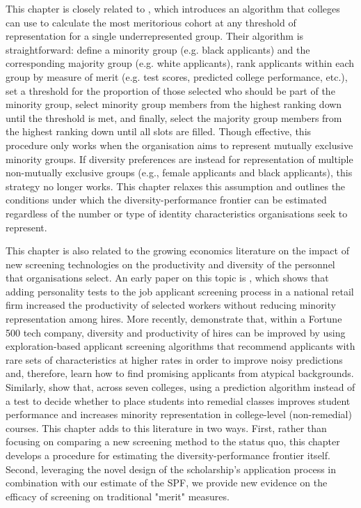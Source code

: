 This chapter is closely related to \textcite{kleinberg2018algorithmic}, which introduces an algorithm that colleges can use to calculate the most meritorious cohort at any threshold of representation for a single underrepresented group. Their algorithm is straightforward: define a minority group (e.g. black applicants) and the corresponding majority group (e.g. white applicants), rank applicants within each group by measure of merit (e.g. test scores, predicted college performance, etc.), set a threshold for the proportion of those selected who should be part of the minority group, select minority group members from the highest ranking down until the threshold is met, and finally, select the majority group members from the highest ranking down until all slots are filled. Though effective, this procedure only works when the organisation aims to represent mutually exclusive minority groups. If diversity preferences are instead for representation of multiple non-mutually exclusive groups (e.g., female applicants and black applicants), this strategy no longer works. This chapter relaxes this assumption and outlines the conditions under which the diversity-performance frontier can be estimated regardless of the number or type of identity characteristics organisations seek to represent.

This chapter is also related to the growing economics literature on the impact of new screening technologies on the productivity and diversity of the personnel that organisations select. An early paper on this topic is \textcite{autor2008does}, which shows that adding personality tests to the job applicant screening process in a national retail firm increased the productivity of selected workers without reducing minority representation among hires. More recently, \textcite{li2020hiring} demonstrate that, within a Fortune 500 tech company, diversity and productivity of hires can be improved by using exploration-based applicant screening algorithms that recommend applicants with rare sets of characteristics at higher rates in order to improve noisy predictions and, therefore, learn how to find promising applicants from atypical backgrounds. Similarly, \textcite{bergman2021seven} show that, across seven colleges, using a prediction algorithm instead of a test to decide whether to place students into remedial classes improves student performance and increases minority representation in college-level (non-remedial) courses. This chapter adds to this literature in two ways. First, rather than focusing on comparing a new screening method to the status quo, this chapter develops a procedure for estimating the diversity-performance frontier itself. Second, leveraging the novel design of the scholarship's application process in combination with our estimate of the SPF, we provide new evidence on the efficacy of screening on traditional "merit" measures. 

